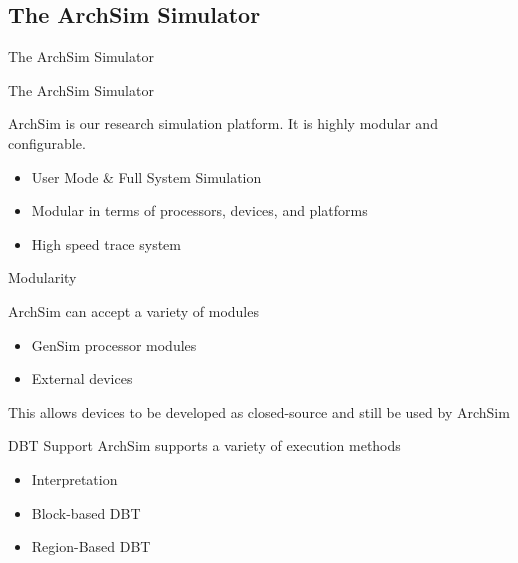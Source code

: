 \subsection{The ArchSim Simulator}

\begin{frame}{The ArchSim Simulator}

\end{frame}

\begin{frame}{The ArchSim Simulator}

ArchSim is our research simulation platform. It is highly modular and configurable.

\begin{itemize}
	\item User Mode \& Full System Simulation
	\item Modular in terms of processors, devices, and platforms
	\item High speed trace system
\end{itemize}

\end{frame}




\begin{frame}{Modularity}

ArchSim can accept a variety of modules
\begin{itemize}
	\item GenSim processor modules
	\item External devices
\end{itemize}

This allows devices to be developed as closed-source and still be used
by ArchSim


\end{frame}

\begin{frame}{DBT Support}
ArchSim supports a variety of execution methods
\begin{itemize}
\item Interpretation
\item Block-based DBT
\item Region-Based DBT
\end{itemize}


\end{frame}

